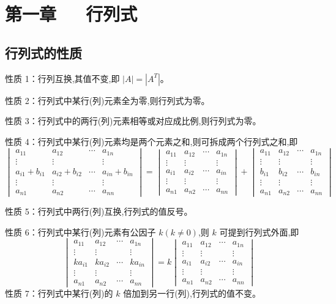 \documentclass[UTF8]{ctexart}
\theoremstyle{remark}
\begin{document}
	\section{第一章~~~行列式}
	\subsection{行列式的性质}
	性质 1：行列互换,其值不变,即 \(|A| = |A^T|\)。
	
	性质 2：行列式中某行(列)元素全为零,则行列式为零。
	
	性质 3：行列式中的两行(列)元素相等或对应成比例,则行列式为零。
	
	性质 4：行列式中某行(列)元素均是两个元素之和,则可拆成两个行列式之和,即
	\[
	\begin{vmatrix}
		a_{11} & a_{12} & \cdots & a_{1n} \\
		\vdots & \vdots & & \vdots \\
		a_{i1}+b_{i1} & a_{i2}+b_{i2} & \cdots & a_{in}+b_{in} \\
		\vdots & \vdots & & \vdots \\
		a_{n1} & a_{n2} & \cdots & a_{nn}
	\end{vmatrix}
	=
	\begin{vmatrix}
		a_{11} & a_{12} & \cdots & a_{1n} \\
		\vdots & \vdots & & \vdots \\
		a_{i1} & a_{i2} & \cdots & a_{in} \\
		\vdots & \vdots & & \vdots \\
		a_{n1} & a_{n2} & \cdots & a_{nn}
	\end{vmatrix}
	+
	\begin{vmatrix}
		a_{11} & a_{12} & \cdots & a_{1n} \\
		\vdots & \vdots & & \vdots \\
		b_{i1} & b_{i2} & \cdots & b_{in} \\
		\vdots & \vdots & & \vdots \\
		a_{n1} & a_{n2} & \cdots & a_{nn}
	\end{vmatrix}
	\]
	
	性质 5：行列式中两行(列)互换,行列式的值反号。
	
	性质 6：行列式中某行(列)元素有公因子 \(k (k\neq 0)\),则 \(k\) 可提到行列式外面,即
	\[
	\begin{vmatrix}
		a_{11} & a_{12} & \cdots & a_{1n} \\
		\vdots & \vdots & & \vdots \\
		ka_{i1} & ka_{i2} & \cdots & ka_{in} \\
		\vdots & \vdots & & \vdots \\
		a_{n1} & a_{n2} & \cdots & a_{nn}
	\end{vmatrix}
	= k
	\begin{vmatrix}
		a_{11} & a_{12} & \cdots & a_{1n} \\
		\vdots & \vdots & & \vdots \\
		a_{i1} & a_{i2} & \cdots & a_{in} \\
		\vdots & \vdots & & \vdots \\
		a_{n1} & a_{n2} & \cdots & a_{nn}
	\end{vmatrix}
	\]
	性质 7：行列式中某行(列)的 \(k\) 倍加到另一行(列),行列式的值不变。
	
\end{document}
